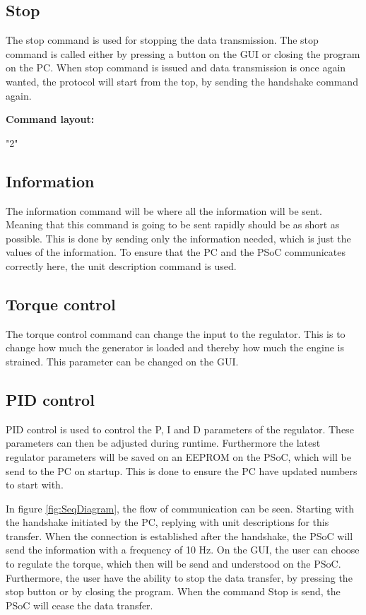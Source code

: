 \subsection{Stop}
The stop command is used for stopping the data transmission. The stop command is called either by pressing a button on the GUI or closing the program on the PC.
When stop command is issued and data transmission is once again wanted, the protocol will start from the top, by sending the handshake command again. 

\textbf{Command layout:}

"2"

\subsection{Information}
The information command will be where all the information will be sent. Meaning that this command is going to be sent rapidly should be as short as possible. This is done by sending only the information needed, which is just the values of the information. To ensure that the PC and the PSoC communicates correctly here, the unit description command is used. 

\subsection{Torque control}
The torque control command  can change the input to the regulator. This is to change how much the generator is loaded and thereby how much the engine is strained. This parameter can be changed on the GUI. 

\subsection{PID control}
PID control is used to control the P, I and D parameters of the regulator. These parameters can then be adjusted during runtime. Furthermore the latest regulator parameters will be saved on an EEPROM on the PSoC, which will be send to the PC on startup. This is done to ensure the PC have updated numbers to start with.
          

In figure \ref{fig:SeqDiagram}, the flow of communication can be seen.
Starting with the handshake initiated by the PC, replying with unit descriptions for this transfer. When the connection is established after the handshake, the PSoC will send the information with a frequency of 10 Hz. On the GUI, the user can choose to regulate the torque, which then will be send and understood on the PSoC. Furthermore, the user have the ability to stop the data transfer, by pressing the stop button or by closing the program. When the command Stop is send, the PSoC will cease the data transfer.

